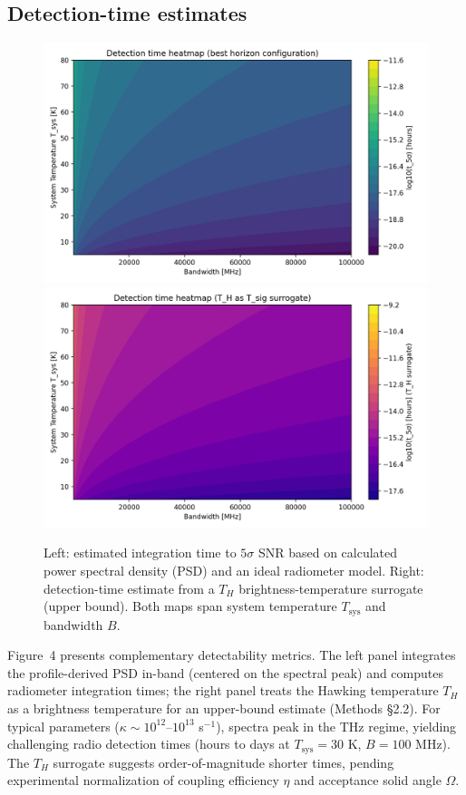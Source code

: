 \documentclass[11pt]{article}
\begin{document}
\subsection{Detection-time estimates}
\begin{figure}[h]
  \centering
  \includegraphics[width=0.48\linewidth]{figures/horizon_analysis_detection_time.png}\hfill
  \includegraphics[width=0.48\linewidth]{figures/horizon_analysis_detection_time_TH.png}
  \caption{Left: estimated integration time to $5\sigma$ SNR based on calculated power spectral density (PSD) and an ideal radiometer model. Right: detection-time estimate from a $T_H$ brightness-temperature surrogate (upper bound). Both maps span system temperature $T_{\text{sys}}$ and bandwidth $B$.}
\end{figure}

Figure~4 presents complementary detectability metrics. The left panel integrates the profile-derived PSD in-band (centered on the spectral peak) and computes radiometer integration times; the right panel treats the Hawking temperature $T_H$ as a brightness temperature for an upper-bound estimate (Methods §2.2). For typical parameters ($\kappa \sim 10^{12}$--$10^{13}$ s$^{-1}$), spectra peak in the THz regime, yielding challenging radio detection times (hours to days at $T_{\text{sys}} = 30$ K, $B = 100$ MHz). The $T_H$ surrogate suggests order-of-magnitude shorter times, pending experimental normalization of coupling efficiency $\eta$ and acceptance solid angle $\Omega$.
\end{document}
